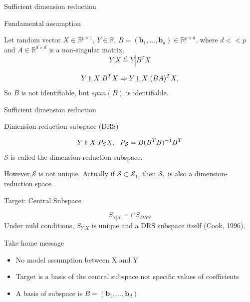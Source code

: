 \documentclass[ignorenonframetext,]{beamer}
\providecommand{\tightlist}{%
  \setlength{\itemsep}{0pt}\setlength{\parskip}{0pt}}
\newcommand{\indep}{\rotatebox[origin=c]{90}{$\models$}}
\begin{document}
\begin{frame}{Sufficient dimension reduction}

\begin{block}{Fundamental assumption}

Let random vector \(X \in \mathbb{R}^{p \times 1}\),
\(Y \in \mathbb{R}\),
\(B = (\mathbf{b}_1, \dots,\mathbf{b}_d) \in \mathbb{R}^{p\times d}\),
where \(d << p\) and \(A \in \mathbb{R}^{d\times d}\) is a non-singular
matrix. \[
Y|X \stackrel{d}{=} Y|B^T X
\]

\[
  Y \indep X|B^TX \Rightarrow Y \indep X|(BA)^TX, 
\] So \(B\) is not identifiable, but \(span(B)\) is identifiable.

\end{block}

\end{frame}

\begin{frame}{Sufficient dimension reduction}

\begin{block}{Dimension-reduction subspace (DRS)}

\[
  Y \indep X|P_SX,~~ P_\mathcal{S} = B(B^TB)^{-1}B^T
\] \(\mathcal{S}\) is called the dimension-reduction subspace.

However,\(\mathcal{S}\) is not unique. Actually if
\(\mathcal{S} \subset \mathcal{S}_1\), then \(\mathcal{S}_1\) is also a
dimension-reduction space.

\end{block}

\begin{block}{Target: Central Subspace}

\[
S_{Y|X} = \cap S_{DRS}
\] Under mild conditions, \(S_{Y|X}\) is unique and a DRS subspace
itself (Cook, 1996).

\end{block}

\end{frame}

\begin{frame}{Take home message}

\begin{itemize}
\tightlist
\item
  No model assumption between X and Y\\
\item
  Target is a basis of the central subspace not specific values of
  coefficients
\item
  A basis of subspace is \(B = (\mathbf{b}_1, \dots, \mathbf{b}_d)\)
\end{itemize}

\end{frame}
\end{document}
